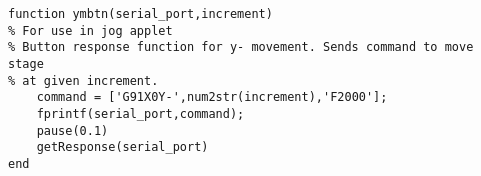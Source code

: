 \begin{lstlisting}
function ymbtn(serial_port,increment)
% For use in jog applet
% Button response function for y- movement. Sends command to move stage
% at given increment.
    command = ['G91X0Y-',num2str(increment),'F2000'];
    fprintf(serial_port,command);
    pause(0.1)
    getResponse(serial_port)
end

\end{lstlisting}